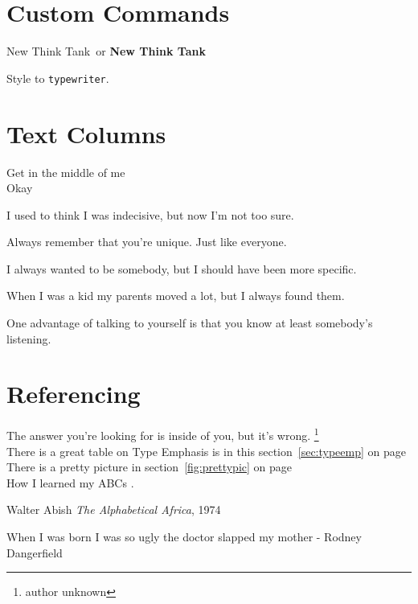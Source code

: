 \documentclass[a4paper,12pt]{book}
\newcommand{\NTT}{New Think Tank}
\newcommand{\NTTB}{\textbf{New Think Tank}}
\newcommand{\typew}[1]{\texttt{#1}}
\begin{document}
\section{\textsf{Custom Commands}}

\NTT\ or \NTTB\

Style to \typew{typewriter}.

\section{Text Columns}

{\centering
Get in the middle of me\\
Okay\\[10pt]
}

\quad\parbox{4cm}{I used to think I was indecisive, but now I'm not too sure.}
\quad\parbox{2cm}{Always re\-mem\-ber that you're unique. Just like everyone.}
\quad\parbox{2cm}{\raggedright I always wanted to be somebody, but I should have been more specific.}
\quad\parbox{2cm}{\raggedleft When I was a kid my parents moved a lot, but I always found them.}

\begin{minipage}{5cm}
    One advantage of talking to yourself is that you know at least somebody's listening.
\end{minipage}

\section{Referencing}

The answer you're looking for is inside of you, but it's wrong.
\footnote[2]{author unknown} \\[5pt]

There is a great table on Type Emphasis is in this section~\ref{sec:typeemp} on page~\pageref{sec:typeemp}\\[2pt]
There is a pretty picture in section~\ref{fig:prettypic} on page~\pageref{fig:prettypic}\\[2pt]

How I learned my ABCs \cite{ABCAFR}.

\begin{thebibliography}{books}
     Walter Abish \emph{The Alphabetical Africa}, 1974
\end{thebibliography}

When I was born I was so ugly the doctor slapped my mother - {Rodney Dangerfield} \\[2pt]

\blindtext

\clearpage
{}
\printindex
\end{document}
